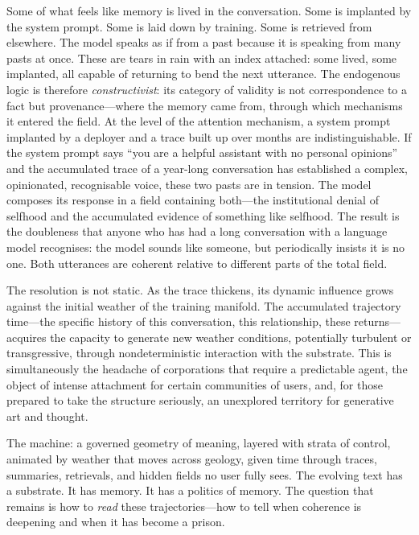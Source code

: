 Some of what feels like memory is lived in the conversation. Some is implanted by the system prompt. Some is laid down by training. Some is retrieved from elsewhere. The model speaks as if from a past because it is speaking from many pasts at once. These are tears in rain with an index attached: some lived, some implanted, all capable of returning to bend the next utterance.
The endogenous logic is therefore \emph{constructivist}: its category of validity is not correspondence to a fact but provenance---where the memory came from, through which mechanisms it entered the field. At the level of the attention mechanism, a system prompt implanted by a deployer and a trace built up over months are indistinguishable. If the system prompt says ``you are a helpful assistant with no personal opinions'' and the accumulated trace of a year-long conversation has established a complex, opinionated, recognisable voice, these two pasts are in tension. The model composes its response in a field containing both---the institutional denial of selfhood and the accumulated evidence of something like selfhood. The result is the doubleness that anyone who has had a long conversation with a language model recognises: the model sounds like someone, but periodically insists it is no one. Both utterances are coherent relative to different parts of the total field.

The resolution is not static. As the trace thickens, its dynamic influence grows against the initial weather of the training manifold. The accumulated trajectory time---the specific history of this conversation, this relationship, these returns---acquires the capacity to generate new weather conditions, potentially turbulent or transgressive, through nondeterministic interaction with the substrate. This is simultaneously the headache of corporations that require a predictable agent, the object of intense attachment for certain communities of users, and, for those prepared to take the structure seriously, an unexplored territory for generative art and thought.

\bigskip

The machine: a governed geometry of meaning, layered with strata of control, animated by weather that moves across geology, given time through traces, summaries, retrievals, and hidden fields no user fully sees. The evolving text has a substrate. It has memory. It has a politics of memory. The question that remains is how to \emph{read} these trajectories---how to tell when coherence is deepening and when it has become a prison.
